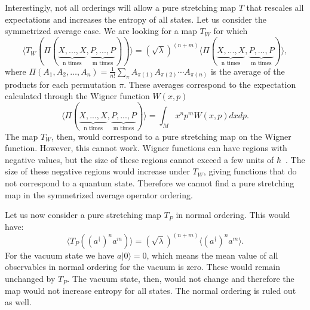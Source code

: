 \documentclass{SciPost}
\begin{document}
Interestingly, not all orderings will allow a pure stretching map $T$ that rescales all expectations and increases the entropy of all states. Let us consider the symmetrized average case. We are looking for a map $T_W$ for which
\begin{equation}
	\langle T_W(\Pi(\underbrace{X, ..., X}_{\text{n times}}, \underbrace{P, ..., P}_{\text{m times}})) \rangle = (\sqrt{\lambda})^{(n+m)} \langle \Pi(\underbrace{X, ..., X}_{\text{n times}}, \underbrace{P, ..., P}_{\text{m times}})\rangle,
\end{equation}
where $\Pi(A_1, A_2, \ldots, A_n)  = \frac{1}{n!} \sum_{\pi}  A_{\pi(1)} A_{\pi(2)} \cdots A_{\pi(n)}$ is the average of the products for each permutation $\pi$. These averages correspond to the expectation calculated through the Wigner function $W(x,p)$
\begin{equation}
	\langle \Pi(\underbrace{X, ..., X}_{\text{n times}}, \underbrace{P, ..., P}_{\text{m times}})\rangle = \int_M x^n p^m W(x, p) dx dp.
\end{equation}
The map $T_W$, then, would correspond to a pure stretching map on the Wigner function. However, this cannot work. Wigner functions can have regions with negative values, but the size of these regions cannot exceed a few units of $\hbar$~\cite{kenfack2004negativity}. The size of these negative regions would increase under $T_W$, giving functions that do not correspond to a quantum state. Therefore we cannot find a pure stretching map in the symmetrized average operator ordering.

Let us now consider a pure stretching map $T_P$ in normal ordering. This would have:
\begin{equation}
	\langle T_P((a^\dagger)^n a^m) \rangle = (\sqrt{\lambda})^{(n+m)} \langle (a^\dagger)^n a^m \rangle.
\end{equation}
For the vacuum state we have $a|0\rangle=0$, which means the mean value of all observables in normal ordering for the vacuum is zero. These would remain unchanged by $T_P$. The vacuum state, then, would not change and therefore the map would not increase entropy for all states. The normal ordering is ruled out as well.
\end{document}
